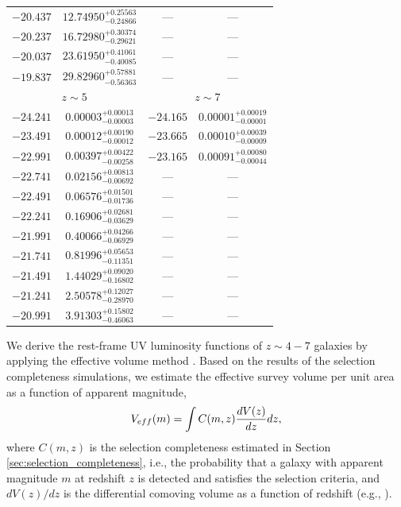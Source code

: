 \documentclass[]{pasj01}
\begin{document}
\begin{table}
{\begin{tabular}{cccc}
$-20.437$ & $12.74950^{+0.25563}_{-0.24866}$ & --- & --- \\
$-20.237$ & $16.72980^{+0.30374}_{-0.29621}$ & --- & --- \\
$-20.037$ & $23.61950^{+0.41061}_{-0.40085}$ & --- & --- \\
$-19.837$ & $29.82960^{+0.57881}_{-0.56363}$ & --- & --- \\  
\hline
  \multicolumn{2}{c}{$z \sim 5$} &   \multicolumn{2}{c}{$z \sim 7$} \\ 
$-24.241$ & $0.00003^{+0.00013}_{-0.00003}$ & $-24.165$ & $0.00001^{+0.00019}_{-0.00001}$ \\
$-23.491$ & $0.00012^{+0.00190}_{-0.00012}$ & $-23.665$ & $0.00010^{+0.00039}_{-0.00009}$ \\
$-22.991$ & $0.00397^{+0.00422}_{-0.00258}$ & $-23.165$ & $0.00091^{+0.00080}_{-0.00044}$ \\
$-22.741$ & $0.02156^{+0.00813}_{-0.00692}$ & --- & --- \\
$-22.491$ & $0.06576^{+0.01501}_{-0.01736}$ & --- & --- \\
$-22.241$ & $0.16906^{+0.02681}_{-0.03629}$ & --- & --- \\
$-21.991$ & $0.40066^{+0.04266}_{-0.06929}$ & --- & --- \\
$-21.741$ & $0.81996^{+0.05653}_{-0.11351}$ & --- & --- \\
$-21.491$ & $1.44029^{+0.09020}_{-0.16802}$ & --- & --- \\
$-21.241$ & $2.50578^{+0.12027}_{-0.28970}$ & --- & --- \\
$-20.991$ & $3.91303^{+0.15802}_{-0.46063}$ & --- & --- \\
  \hline
\end{tabular}}\label{tab:UVLF}
\end{table}



We derive the rest-frame UV luminosity functions of $z\sim4-7$ galaxies 
by applying the effective volume method \citep{1999ApJ...519....1S}. 
Based on the results of the selection completeness simulations, 
we estimate the effective survey volume per unit area 
as a function of apparent magnitude, 
\begin{equation}
V_{\rm eff} (m) 
= \int C(m,z) \frac{dV(z)}{dz} dz, 
\end{equation}
where $C(m,z)$ is the selection completeness estimated in Section \ref{sec:selection_completeness}, 
i.e., the probability that a galaxy 
with apparent magnitude $m$ at redshift $z$ is detected and 
satisfies the selection criteria, 
and 
$dV(z)/dz$ is the differential comoving volume as a function of redshift 
(e.g., \cite{1999astro.ph..5116H}). 
\end{document}

